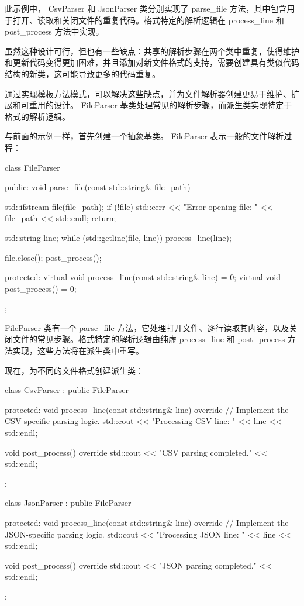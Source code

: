 此示例中， CsvParser 和 JsonParser 类分别实现了 parse\_file 方法，其中包含用于打开、读取和关闭文件的重复代码。格式特定的解析逻辑在 process\_line 和 post\_process 方法中实现。

虽然这种设计可行，但也有一些缺点：共享的解析步骤在两个类中重复，使得维护和更新代码变得更加困难，并且添加对新文件格式的支持，需要创建具有类似代码结构的新类，这可能导致更多的代码重复。

通过实现模板方法模式，可以解决这些缺点，并为文件解析器创建更易于维护、扩展和可重用的设计。 FileParser 基类处理常见的解析步骤，而派生类实现特定于格式的解析逻辑。

与前面的示例一样，首先创建一个抽象基类。 FileParser 表示一般的文件解析过程：

\begin{cpp}
class FileParser {
public:
    void parse_file(const std::string& file_path) {
        std::ifstream file(file_path);
        if (!file) {
            std::cerr << "Error opening file: " << file_path << std::endl;
            return;
        }

        std::string line;
        while (std::getline(file, line)) {
            process_line(line);
        }

        file.close();
        post_process();
    }

protected:
    virtual void process_line(const std::string& line) = 0;
    virtual void post_process() = 0;
};
\end{cpp}

FileParser 类有一个 parse\_file 方法，它处理打开文件、逐行读取其内容，以及关闭文件的常见步骤。格式特定的解析逻辑由纯虚 process\_line 和 post\_process 方法实现，这些方法将在派生类中重写。

现在，为不同的文件格式创建派生类：

\begin{cpp}
class CsvParser : public FileParser {
protected:
    void process_line(const std::string& line) override {
        // Implement the CSV-specific parsing logic.
        std::cout << "Processing CSV line: " << line << std::endl;
    }

    void post_process() override {
        std::cout << "CSV parsing completed." << std::endl;
    }
};

class JsonParser : public FileParser {
protected:
    void process_line(const std::string& line) override {
        // Implement the JSON-specific parsing logic.
        std::cout << "Processing JSON line: " << line << std::endl;
    }

    void post_process() override {
        std::cout << "JSON parsing completed." << std::endl;
    }
};
\end{cpp}

